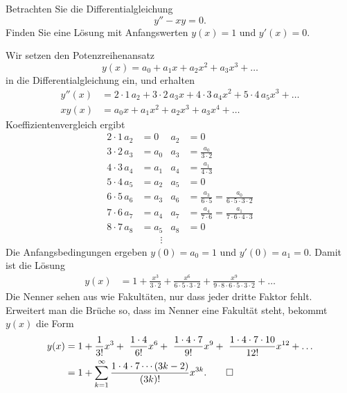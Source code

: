 Betrachten Sie die Differentialgleichung
\[
y'' - xy = 0.
\]
Finden Sie eine Lösung mit Anfangswerten $y(x)=1$ und $y'(x)=0$.

\begin{loesung}
Wir setzen den Potenzreihenansatz
\[
y(x) = a_0 + a_1x + a_2x^2 + a_3x^3+\dots
\]
in die Differentialgleichung ein, und erhalten
\begin{align*}
y''(x)
&=
2\cdot 1\, a_2 + 3\cdot 2\, a_3x + 4\cdot 3\, a_4x^2 + 5\cdot 4\,a_5x^3+\dots
\\
xy(x)
&=
a_0x + a_1x^2 + a_2x^3+a_3x^4+\dots
\end{align*}
Koeffizientenvergleich ergibt
\begin{align*}
2\cdot 1\,a_2 &= 0    &a_2&=0\\
3\cdot 2\,a_3 &= a_0  &a_3&=\frac{a_0}{3\cdot 2}\\
4\cdot 3\,a_4 &= a_1  &a_4&=\frac{a_1}{4\cdot 3}\\
5\cdot 4\,a_5 &= a_2  &a_5&=0\\
6\cdot 5\,a_6 &= a_3  &a_6&=\frac{a_3}{6\cdot 5}=\frac{a_0}{6\cdot 5\cdot 3\cdot 2}\\
7\cdot 6\,a_7 &= a_4  &a_7&=\frac{a_4}{7\cdot 6}=\frac{a_1}{7\cdot 6\cdot 4\cdot 3}\\
8\cdot 7\,a_8 &= a_5  &a_8&=0\\
              &\qquad\vdots
\end{align*}
Die Anfangsbedingungen ergeben $y(0)=a_0=1$ und $y'(0)=a_1=0$.
Damit ist die Lösung
\begin{align*}
y(x)
&=
1
+ \frac{x^3}{3\cdot 2}
+ \frac{x^6}{6\cdot 5\cdot 3\cdot 2}
+ \frac{x^9}{9\cdot 8\cdot 6\cdot 5\cdot 3\cdot 2}
+ \dots
\end{align*}
Die Nenner sehen aus wie Fakultäten, nur dass jeder dritte Faktor fehlt.
Erweitert man die Brüche so, dass im Nenner eine Fakultät steht, bekommt
$y(x)$ die Form
\begin{align*}
y(x)
&=
1
+ \frac{1}{3!}x^3
+ \frac{1\cdot 4}{6!}x^6
+ \frac{1\cdot 4\cdot 7}{9!}x^9
+ \frac{1\cdot 4\cdot 7\cdot 10}{12!}x^{12}
+ \dots
\\
&=
1 + \sum_{k=1}^\infty \frac{1\cdot 4\cdot 7\cdots (3k-2)}{(3k)!} x^{3k}.
\qedhere
\end{align*}
\end{loesung}

